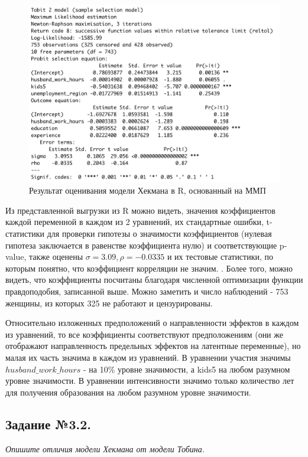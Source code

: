 \documentclass[a4paper,12pt]{article}
\begin{document}
\begin{figure}[!h] \centering
	\caption{Результат оценивания модели Хекмана в R, основанный на ММП}
	\label{hekman1}
	\includegraphics[scale=0.7]{heckman1.png}
\end{figure}

Из представленной выгрузки из R можно видеть, значения коэффициентов каждой переменной в каждом из 2 уравнений, их стандартные ошибки,  t-статистики для проверки гипотезы о значимости коэффициентов (нулевая гипотеза заключается в равенстве коэффициента нулю) и соответствующие p-value, также оценены $\sigma = 3.09, \rho = -0.0335$ и их тестовые статистики, по которым понятно, что коэффициент корреляции не значим. . Более того, можно видеть, что коэффициенты посчитаны благодаря численной оптимизации функции правдоподобия, записанной выше. Можно заметить и число наблюдений - 753 женщины, из которых 325 не работают и цензурированы. 


Относительно изложенных предположений о направленности эффектов в каждом из уравнений, то все коэффициенты соответствуют предположениям (они же отображают направленность предельных эффектов на латентные переменные), но малая их часть значима в каждом из уравнений. В уравнении участия значимы $husband\_work\_hours$ - на 10\% уровне значимости, а kids5 на любом разумном уровне значимости. В уравнении интенсивности значимо только количество лет для получения образования на любом разумном уровне значимости.


\subsection{Задание №3.2.} 
\textit{Опишите отличия модели Хекмана от модели Тобина.}
\end{document}
